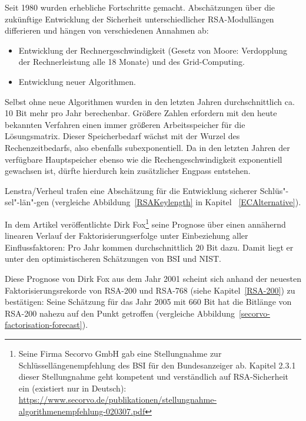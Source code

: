 \begin{refsegment}
Seit 1980 wurden erhebliche Fortschritte gemacht.
Abschätzungen über die zukünftige Entwicklung der Sicherheit
unterschiedlicher RSA-Modullängen differieren und hängen von
verschiedenen Annahmen ab:
\begin{itemize}
   \item Entwicklung der Rechnergeschwindigkeit (Gesetz von Moore:
         Verdopplung der Rechnerleistung alle 18 Monate)
         und des Grid-Computing.
   \item Entwicklung neuer Algorithmen.
\end{itemize}
Selbst ohne neue Algorithmen wurden in den letzten Jahren durchschnittlich
ca. 10 Bit mehr pro Jahr berechenbar.  Größere Zahlen erfordern mit den
heute bekannten Verfahren einen immer größeren Arbeitsspeicher für die
Lösungsmatrix. Dieser Speicherbedarf wächst mit der Wurzel des
Rechenzeitbedarfs, also ebenfalls subexponentiell. Da in den letzten Jahren
der verfügbare Hauptspeicher ebenso wie die Rechengeschwindigkeit exponentiell
gewachsen ist, dürfte hierdurch kein zusätzlicher Engpass entstehen.


Lenstra/Verheul \cite{LeVe2001} trafen eine Abschätzung für die Entwicklung sicherer Schlüs"-sel"-län"-gen (vergleiche Abbildung~\ref{RSAKeylength}
in Kapitel ~\ref{ECAlternative}).


\begin{sloppypar}  %
  In dem Artikel \cite{Bourseau2002} veröffentlichte Dirk Fox\footnote{%
  Seine Firma Secorvo GmbH gab eine Stellungnahme zur
  Schlüssellängenempfehlung des BSI für den Bundesanzeiger
  ab. Kapitel 2.3.1 dieser Stellungnahme geht kompetent
  und verständlich auf RSA-Sicherheit ein (existiert nur in Deutsch):\\
  \url{https://www.secorvo.de/publikationen/stellungnahme-algorithmenempfehlung-020307.pdf}
  }
  seine Prognose über einen annähernd linearen Verlauf der Faktorisierungserfolge
  unter Einbeziehung aller Einflussfaktoren: Pro Jahr kommen durchschnittlich 20
  Bit dazu. Damit liegt er unter den optimistischeren Schätzungen von BSI und NIST.
\end{sloppypar}


Diese Prognose von Dirk Fox aus dem Jahr 2001 scheint sich
anhand der neuesten Faktorisierungsrekorde von RSA-200 und RSA-768 (siehe Kapitel~\ref{RSA-200})
zu bestätigen: Seine Schätzung für das Jahr 2005 mit 660 Bit hat die Bitlänge
von RSA-200 nahezu auf den Punkt getroffen (vergleiche
Abbildung~\ref{secorvo-factorisation-forecast}).


\end{refsegment}
